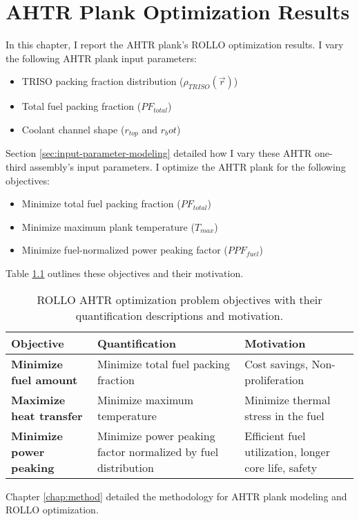 \chapter{AHTR Plank Optimization Results}
\glsresetall
\label{chap:ahtr-plank-opt-results}
In this chapter, I report the \gls{AHTR} plank's \gls{ROLLO} optimization results. 
I vary the following \gls{AHTR} plank input parameters:
\begin{itemize}
    \item \gls{TRISO} packing fraction distribution ($\rho_{TRISO}(\vec{r})$)
    \item Total fuel packing fraction ($PF_{total}$) 
    \item Coolant channel shape ($r_{top}$ and $r_bot$)
\end{itemize} 
Section \ref{sec:input-parameter-modeling} detailed how I vary these 
\gls{AHTR} one-third assembly's input parameters. 
I optimize the \gls{AHTR} plank for the following objectives:
\begin{itemize}
    \item Minimize total fuel packing fraction ($PF_{total}$)
    \item Minimize maximum plank temperature ($T_{max}$)
    \item Minimize fuel-normalized power peaking factor ($PPF_{fuel}$)
\end{itemize} 
Table \ref{tab:objectives-2} outlines these objectives and their motivation.
\begin{table}[htbp]
    \centering
    \onehalfspacing
    \caption{\acrfull{ROLLO} \acrfull{AHTR} optimization problem objectives with 
    their quantification descriptions and motivation.}
	\label{tab:objectives-2}
    \footnotesize
    \begin{tabular}{p{4.5cm}|p{5cm}p{5cm}}
    \hline 
    \textbf{Objective}& \textbf{Quantification}& \textbf{Motivation} \\
    \hline
    \textbf{Minimize fuel amount} & Minimize total fuel packing \newline fraction 
    & Cost savings, Non-proliferation \\ 
    \hline
    \textbf{Maximize heat transfer} & Minimize maximum temperature 
    & Minimize thermal stress in the fuel \\
    \hline
    \textbf{Minimize power peaking} & Minimize power peaking factor normalized by fuel distribution 
    & Efficient fuel utilization, longer core life, safety\\
    \hline
    \end{tabular}
\end{table}
Chapter \ref{chap:method} detailed the methodology for \gls{AHTR} plank modeling 
and \gls{ROLLO} optimization. 

